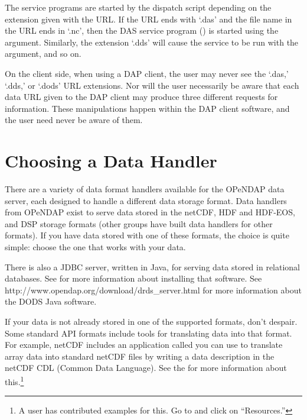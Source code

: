 \documentclass{dods-book}
\begin{document}
The service programs are started by the dispatch script depending on
the extension given with the URL. If the URL ends with `.das' and the
file name in the URL ends in `.nc', then the DAS service program
() is started using the  argument.
Similarly, the extension `.dds' will cause the 
service to be run with the  argument, and so on. 

On the client side, when using a DAP client, the user may never see
the `.das,' `.dds,' or `.dods' URL extensions. Nor will the user
necessarily be aware that each data URL given to the DAP client may
produce three different requests for information. These manipulations
happen within the DAP client software, and the user need never be
aware of them.


\section{Choosing a Data Handler}

%

There are a variety of data format handlers available for the OPeNDAP
data server, each designed to handle a different data storage format.
Data handlers from OPeNDAP exist to serve data stored in the netCDF,
HDF and HDF-EOS, and DSP storage formats (other groups have built data
handlers for other formats). If you have data stored with one of these
formats, the choice is quite simple: choose the one that works with
your data.

There is also a JDBC server, written in Java, for serving data
stored in relational databases.  See  for more
information about installing that software.
See 
{http://www.opendap.org/download/drds_server.html}
for more information about the DODS Java software.

If your data is not already stored in one of the supported formats,
don't despair.  Some standard API formats include tools for
translating data into that format.  For example, netCDF includes an
application called  you can use to translate array data
into standard netCDF files by writing a data description in the netCDF
CDL (Common Data Language).  See the 
for more information about this.\footnote{A user has contributed
  examples for this.  Go to
   and click on ``Resources.''}
\end{document}
